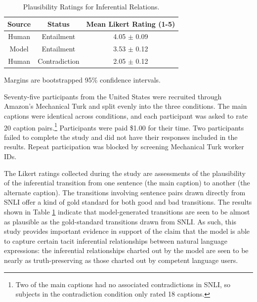 \begin{table}[!t]
\begin{center} 
\begin{threeparttable}

\setlength{\tabcolsep}{16pt}

\caption{Plausibility Ratings for Inferential Relations.} 
\label{ratings} 
\vskip 0.12in
\begin{tabular}{c c c} 
\hline
Source & Status &  Mean Likert Rating (1-5) \\
\hline
\rule{0pt}{3ex}Human & Entailment  &  4.05  $\pm$ 0.09 \\
Model & Entailment  &  3.53 $\pm$  0.12 \\
Human & Contradiction & 2.05 $\pm$ 0.12 \\

\hline
\end{tabular}
\begin{tablenotes}
      \vskip 0.06in
      \footnotesize
      \item\centering * Margins are bootstrapped 95\% confidence intervals.
\end{tablenotes}

\end{threeparttable}
\end{center} 
\end{table}

Seventy-five participants from the United States were recruited through Amazon's Mechanical Turk and split evenly into the three conditions.  The main captions were identical across conditions, and each participant was asked to rate 20 caption pairs.\footnote{Two of the main captions had no associated contradictions in SNLI, so subjects in the contradiction condition only rated 18 captions.} Participants were paid \$1.00 for their time. Two participants failed to complete the study and did not have their responses included in the results. Repeat participation was blocked by screening Mechanical Turk worker IDs. 

The Likert ratings collected during the study are assessments of the plausibility of the inferential transition from one sentence (the main caption) to another (the alternate caption). The transitions involving sentence pairs drawn directly from SNLI offer a kind of gold standard for both good and bad transitions. The results shown in Table \ref{ratings} indicate that model-generated transitions are seen to be almost as plausible as the gold-standard transitions drawn from SNLI. As such, this study provides important evidence in support of the claim that the model is able to capture certain tacit inferential relationships between natural language expressions: the inferential relationships charted out by the model are seen to be nearly as truth-preserving as those charted out by competent language users. 

